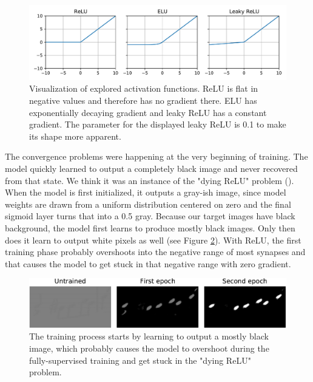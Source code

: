 \begin{figure}[ht]
    \centering
    \includegraphics[width=140mm]{../../figures/03-activation-function/functions.pdf}
    \caption{Visualization of explored activation functions. ReLU is flat in negative values and therefore has no gradient there. ELU has exponentially decaying gradient and leaky ReLU has a constant gradient. The parameter for the displayed leaky ReLU is 0.1 to make its shape more apparent.}
    \label{fig:ActivationFunctions}
\end{figure}

The convergence problems were happening at the very beginning of training. The model quickly learned to output a completely black image and never recovered from that state. We think it was an instance of the "dying ReLU" problem (\cite{DyingRelu}). When the model is first initialized, it outputs a gray-ish image, since model weights are drawn from a uniform distribution centered on zero and the final sigmoid layer turns that into a 0.5 gray. Because our target images have black background, the model first learns to produce mostly black images. Only then does it learn to output white pixels as well (see Figure \ref{fig:ActivationTrainingProgression}). With ReLU, the first training phase probably overshoots into the negative range of most synapses and that causes the model to get stuck in that negative range with zero gradient.

\begin{figure}[ht]
    \centering
    \includegraphics[width=145mm]{../../figures/03-activation-function/progression.pdf}
    \caption{The training process starts by learning to output a mostly black image, which probably causes the model to overshoot during the fully-supervised training and get stuck in the "dying ReLU" problem.}
    \label{fig:ActivationTrainingProgression}
\end{figure}

